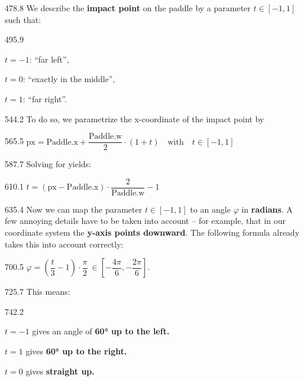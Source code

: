 \documentclass{aslab}
\begin{document}
\begin{region}{478.8}
We describe the \textbf{impact point} on the paddle by a parameter
$t\in[-1,1]$ such that:
\end{region}

\begin{region}[pitch=17.15]{495.9}
\begin{dashlist}
\item $t=-1$: ``far left'',
\item $t=0$: ``exactly in the middle'',
\item $t=1$: ``far right''.
\end{dashlist}
\end{region}

\begin{region}{544.2}
To do so, we parametrize the x-coordinate of the impact point  by
\end{region}

\begin{region}{565.5}
\centering $\text{px} = \text{Paddle.x} + \dfrac{\text{Paddle.w}}{2}\cdot(1+t)
  \quad\text{with}\quad t\in[-1,1]$
\end{region}

\begin{region}{587.7}
Solving for  yields:
\end{region}

\begin{region}{610.1}
\centering $t = (\text{px} - \text{Paddle.x})\cdot\dfrac{2}{\text{Paddle.w}}-1$
\end{region}

\begin{region}[pitch=13.8]{635.4}
Now we can map the parameter $t\in[-1,1]$ to an angle $\varphi$ in
\textbf{radians}. A few annoying details have to be taken into account -- for
example, that in our coordinate system the \textbf{y-axis points downward}.
The following formula already takes this into account correctly:
\end{region}

\begin{region}{700.5}
\centering $\varphi = \left(\dfrac{t}{3}-1\right)\cdot\dfrac{\pi}{2}\ \in
  \left[-\dfrac{4\pi}{6}, -\dfrac{2\pi}{6}\right].$
\end{region}

\begin{region}{725.7}
This means:
\end{region}

\begin{region}[pitch=17.15]{742.2}
\begin{dashlist}
\item $t=-1$ gives an angle of \textbf{60° up to the left.}
\item $t=1$ gives \textbf{60° up to the right.}
\item $t=0$ gives \textbf{straight up.}
\end{dashlist}
\end{region}
\end{document}
